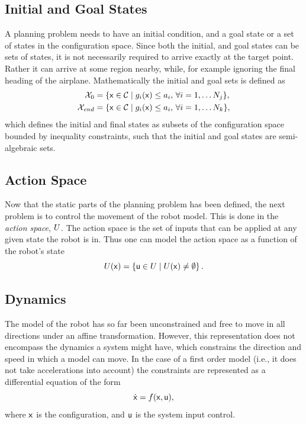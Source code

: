 \subsection{Initial and Goal States}

A planning problem needs to have an initial condition, and a goal state or a set
of states in the configuration space. Since both the initial, and goal states
can be sets of states, it is not necessarily required to arrive exactly at the
target point. Rather it can arrive at some region nearby, while, for example
ignoring the final heading of the airplane. Mathematically the initial and goal
sets is defined as
\begin{align*}
  \mathcal{X}_0 &= \lbrace {\mathbf{\mathsf{x}}} \in \mathcal{C}{} \mid g_i({\mathbf{\mathsf{x}}}) \leq a_i,
                  \, \forall i = 1,\ldots N_j\rbrace, \\
  \mathcal{X}_{\mathit{end}} &= \lbrace {\mathbf{\mathsf{x}}} \in \mathcal{C}{} \mid g_i({\mathbf{\mathsf{x}}}) \leq
                      a_i, \, \forall i = 1,\ldots N_k\rbrace,
\end{align*}
which defines the initial and final states as subsets of the configuration space
bounded by inequality constraints, such that the initial and goal states are
semi-algebraic sets.


\subsection{Action Space}

Now that the static parts of the planning problem has been defined, the next
problem is to control the movement of the robot model. This is done in the
\textit{action space}, \(U{}\). The action space is the set of
inputs that can be applied at any given state the robot is in. Thus one can
model the action space as a function of the robot's state
\[
  U({\mathbf{\mathsf{x}}}) = \lbrace{\mathbf{\mathsf{u}}} \in U \mid
    U({\mathbf{\mathsf{x}}}) \neq \emptyset \rbrace \, .
\]

\subsection{Dynamics}

The model of the robot has so far been unconstrained and free to move in all
directions under an affine transformation. However, this representation does not
encompass the dynamics a system might have, which constrains the direction and
speed in which a model can move. In the case of a first order model (i.e., it
does not take accelerations into account) the constraints are represented as a
differential equation of the form
\[
  \dot{{\mathbf{\mathsf{x}}}} = f({\mathbf{\mathsf{x}}},{\mathbf{\mathsf{u}}}),
\]
where \({\mathbf{\mathsf{x}}}\) is the configuration, and \({\mathbf{\mathsf{u}}}\) is the system input
control.

